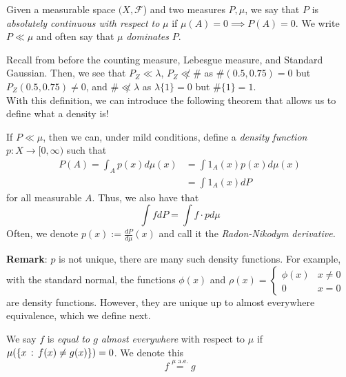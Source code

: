 
\begin{definition}
    Given a measurable space $(X, \mathcal{F}$) and two measures $P, \mu$, we say that $P$ is \emph{absolutely continuous with respect to }$\mu$ if $\mu(A) = 0 \implies P(A) = 0$. We write $P \ll \mu$ and often say that $\mu$ \emph{dominates} $P$. 
\end{definition}
Recall from before the counting measure, Lebesgue measure, and Standard Gaussian. Then, we see that $P_{Z} \ll \lambda$, $P_{Z} \not \ll \#$ as $\#(0.5, 0.75) = 0$ but $P_{Z}(0.5, 0.75) \ne 0$, and $\# \not \ll \lambda$ as $\lambda\{1\} = 0$ but $\#\{1\} = 1$.\\

With this definition, we can introduce the following theorem that allows us to define what a density is!

\begin{theorem}
    If $P \ll \mu$, then we can, under mild conditions, define a \emph{density function} $p : X \to [0, \infty)$ such that
    \begin{align*}
        P(A) = \int_{A} p(x) d\mu(x) &= \int 1_{A}(x) p(x)d\mu(x)\\
        &= \int 1_{A}(x) dP
    \end{align*}
    for all measurable $A$. Thus, we also have that
    \[ \int f dP = \int f \cdot p d\mu \]
    Often, we denote $p(x) := \frac{dP}{d\mu}(x)$ and call it the \emph{Radon-Nikodym derivative.}
\end{theorem}
\textbf{Remark}: $p$ is not unique, there are many such density functions. For example, with the standard normal, the functions $\phi(x)$ and $\rho(x) = \left\{\begin{matrix} \phi(x) & x \ne 0 \\ 0 & x = 0 \end{matrix}\right.$ are density functions. However, they are unique up to almost everywhere equivalence, which we define next.

\begin{definition}
    We say $f$ is \emph{equal to $g$ almost everywhere} with respect to $\mu$ if $\mu(\{x \, :\, f(x) \ne g(x)\}) = 0$. We denote this
    \[ f \overset{\mu \text{ a.e.}}{=} g \]
\end{definition}

